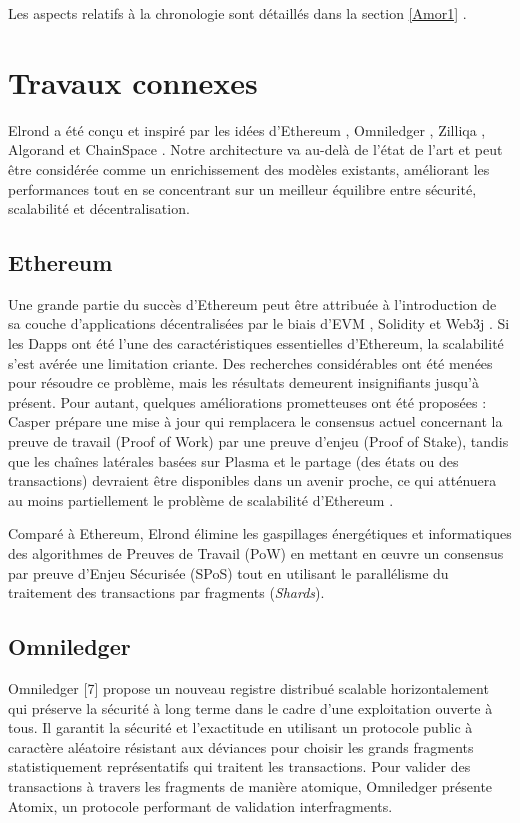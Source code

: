 \documentclass[journal]{IEEEtran}
\begin{document}
Les aspects relatifs à la chronologie sont détaillés dans la section \ref{Amor1}  .

\section{Travaux connexes}
Elrond a été conçu et inspiré par les idées d'Ethereum  \cite{6}, Omniledger  \cite{7}, Zilliqa  \cite{8}, Algorand \cite{4} et ChainSpace \cite{9}. Notre architecture va au-delà de l'état de l'art et peut être considérée comme un enrichissement des modèles existants, améliorant les performances tout en se concentrant sur un meilleur équilibre entre sécurité, scalabilité et décentralisation.

\subsection{Ethereum}
Une grande partie du succès d'Ethereum  \cite{6} peut être attribuée à l'introduction de sa couche d'applications décentralisées par le biais d'EVM  \cite{10}, Solidity  \cite{11} et Web3j  \cite{12}. Si les Dapps ont été l'une des caractéristiques essentielles d'Ethereum, la scalabilité s'est avérée une limitation criante. Des recherches considérables ont été menées pour résoudre ce problème, mais les résultats demeurent insignifiants jusqu'à présent. Pour autant, quelques améliorations prometteuses ont été proposées : Casper  \cite{13} prépare une mise à jour qui remplacera le consensus actuel concernant la preuve de travail (Proof of Work) par une preuve d'enjeu (Proof of Stake), tandis que les chaînes latérales basées sur Plasma et le partage (des états ou des transactions) devraient être disponibles dans un avenir proche, ce qui atténuera au moins partiellement le problème de scalabilité d'Ethereum  \cite{14}.

Comparé à Ethereum, Elrond élimine les gaspillages énergétiques et informatiques des algorithmes de Preuves de Travail (PoW) en mettant en œuvre un consensus par preuve d’Enjeu Sécurisée (SPoS) tout en utilisant le parallélisme du traitement des transactions par fragments (\textit{Shards}).


\subsection{Omniledger}
Omniledger [7] propose un nouveau registre distribué scalable horizontalement qui préserve la sécurité à long terme dans le cadre d'une exploitation ouverte à tous. Il garantit la sécurité et l'exactitude en utilisant un protocole public à caractère aléatoire résistant aux déviances pour choisir les grands fragments statistiquement représentatifs qui traitent les transactions. Pour valider des transactions à travers les fragments de manière atomique, Omniledger présente Atomix, un protocole performant de validation interfragments.
\end{document}
